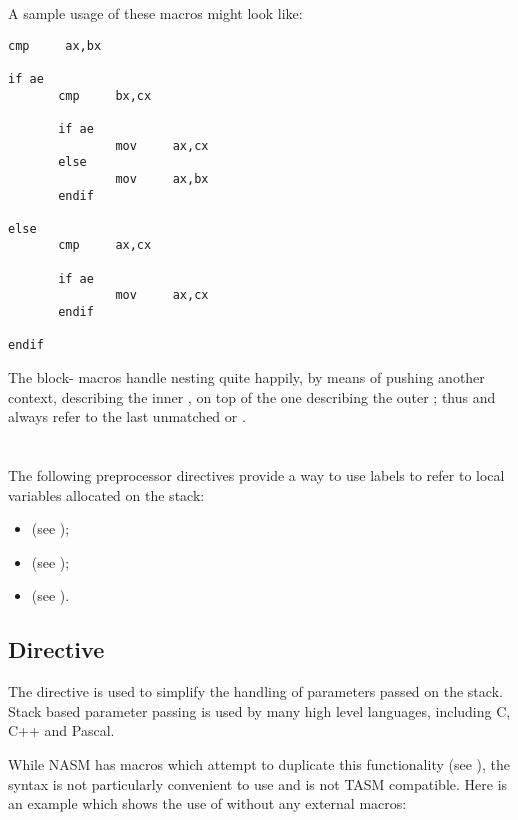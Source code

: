A sample usage of these macros might look like:

\begin{lstlisting}
cmp     ax,bx

if ae
       cmp     bx,cx

       if ae
               mov     ax,cx
       else
               mov     ax,bx
       endif

else
       cmp     ax,cx

       if ae
               mov     ax,cx
       endif

endif
\end{lstlisting}

The block- macros handle nesting quite happily, by means of
pushing another context, describing the inner , on top of the
one describing the outer ; thus  and 
always refer to the last unmatched  or .

\section{}
\label{sec:stackrel}

The following preprocessor directives provide a way to use
labels to refer to local variables allocated on the stack:

\begin{itemize}
	\item{  (see );}
	\item{  (see );}
	\item{  (see ).}
\end{itemize}

\subsection{ Directive}
\label{subsec:arg}

The  directive is used to simplify the handling of
parameters passed on the stack. Stack based parameter passing
is used by many high level languages, including C, C++ and Pascal.

While NASM has macros which attempt to duplicate this functionality
(see ), the syntax is not particularly convenient
to use and is not TASM compatible. Here is an example which shows the use
of  without any external macros:

